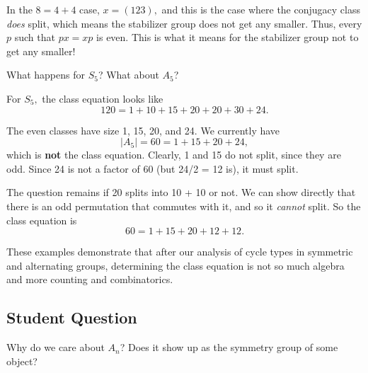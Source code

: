 In the $8 = 4 + 4$ case, $x = (123),$ and this is the case where the conjugacy class \emph{does} split, which means the stabilizer group does not get any smaller. Thus, every $p$ such that $px = xp$ is even. This is what it means for the stabilizer group not to get any smaller!

\begin{example}
What happens for $S_5$? What about $A_5$?
\end{example}

For $S_5,$ the class equation looks like 
\[
\boxed{120 = 1 + 10 + 15 + 20 + 20 + 30 + 24}.
\]

The even classes have size 1, 15, 20, and 24. We currently have \[|A_5| = 60 = 1 + 15 + 20 + 24,\] which is \textbf{not} the class equation. Clearly, 1 and 15 do not split, since they are odd. Since 24 is not a factor of 60 (but 24/2 = 12 is), it must split. 

The question remains if 20 splits into 10 + 10 or not. We can show directly that there is an odd permutation that commutes with it, and so it \emph{cannot} split. So the class equation is \[\boxed{60 = 1 + 15 + 20 + 12 + 12}.\]

These examples demonstrate that after our analysis of cycle types in symmetric and alternating groups, determining the class equation is not so much algebra and more counting and combinatorics.

\subsection{Student Question}
\begin{question}
Why do we care about $A_n$? Does it show up as the symmetry group of some object?
\end{question}

